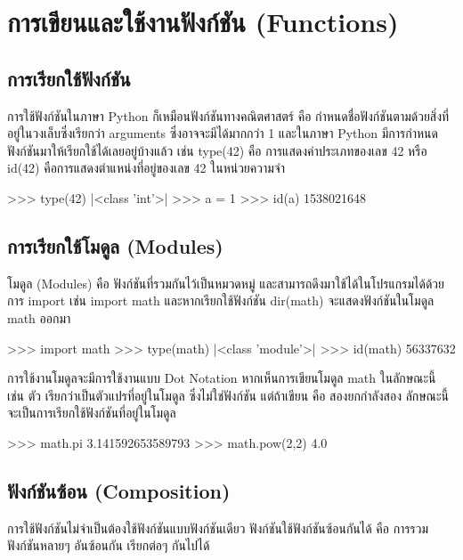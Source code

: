 \chapter{การเขียนและใช้งานฟังก์ชัน (Functions)}
\section{การเรียกใช้ฟังก์ชัน}

การใช้ฟังก์ชันในภาษา Python ก็เหมือนฟังก์ชันทางคณิตศาสตร์ คือ กำหนดชื่อฟังก์ชันตามด้วยสิ่งที่อยู่ในวงเล็บซึ่งเรียกว่า arguments ซึ่งอาจจะมีได้มากกว่า 1 และในภาษา Python มีการกำหนดฟังก์ชันมาให้เรียกใช้ได้เลยอยู่บ้างแล้ว เช่น type(42) คือ การแสดงค่าประเภทของเลข 42 หรือ id(42) คือการแสดงตำแหน่งที่อยู่ของเลข 42 ในหน่วยความจำ

\begin{codelist}{}{}
>>> type(42)
|<class \rq{}int\rq{}>|
>>> a = 1
>>> id(a)
1538021648
\end{codelist}


\section{การเรียกใช้โมดูล (Modules)}

โมดูล (Modules) คือ ฟังก์ชันที่รวมกันไว้เป็นหมวดหมู่ และสามารถดึงมาใช้ได้ในโปรแกรมได้ด้วยการ import เช่น import math และหากเรียกใช้ฟังก์ชัน dir(math) จะแสดงฟังก์ชันในโมดูล math ออกมา 

\begin{codelist}{}{}
>>> import math
>>> type(math)
|<class \rq{}module\rq{}>|
>>> id(math)
56337632

\end{codelist}


การใช้งานโมดูลจะมีการใช้งานแบบ Dot Notation หากเห็นการเขียนโมดูล math ในลักษณะนี้ เช่น   ตัว   เรียกว่าเป็นตัวแปรที่อยู่ในโมดูล   ซึ่งไม่ใช่ฟังก์ชัน แต่ถ้าเขียน   คือ สองยกกำลังสอง ลักษณะนี้จะเป็นการเรียกใช้ฟังก์ชันที่อยู่ในโมดูล

\begin{codelist}{}{}
>>> math.pi
3.141592653589793
>>> math.pow(2,2)
4.0
\end{codelist}


\section{ฟังก์ชันซ้อน (Composition)}

การใช้ฟังก์ชันไม่จำเป็นต้องใช้ฟังก์ชันแบบฟังก์ชันเดียว ฟังก์ชันใช้ฟังก์ชันซ้อนกันได้ คือ การรวมฟังก์ชันหลายๆ อันซ้อนกัน เรียกต่อๆ กันไปได้

